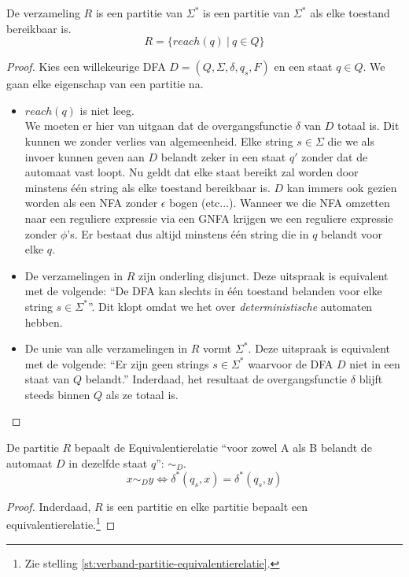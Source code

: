 \documentclass[main.tex]{subfiles}
\begin{document}
\begin{st}
  De verzameling $R$ is een partitie van $\Sigma^{*}$ is een partitie van $\Sigma^{*}$ als elke toestand bereikbaar is.
  \[ R = \{ reach(q)\ |\ q \in Q \} \]

  \begin{proof}
    Kies een willekeurige DFA $D = (Q,\Sigma,\delta,q_{s},F)$ en een staat $q\in Q$.
    We gaan elke eigenschap van een partitie na.
    \begin{itemize}
    \item $reach(q)$ is niet leeg.\\
      We moeten er hier van uitgaan dat de overgangsfunctie $\delta$ van $D$ totaal is.
      Dit kunnen we zonder verlies van algemeenheid.
      Elke string $s\in \Sigma$ die we als invoer kunnen geven aan $D$ belandt zeker in een staat $q'$ zonder dat de automaat vast loopt.
      Nu geldt dat elke staat bereikt zal worden door minstens \'e\'en string als elke toestand bereikbaar is.
      $D$ kan immers ook gezien worden als een NFA zonder $\epsilon$ bogen (etc...). Wanneer we die NFA omzetten naar een reguliere expressie via een GNFA krijgen we een reguliere expressie zonder $\phi$'s. Er bestaat dus altijd minstens \'e\'en string die in $q$ belandt voor elke $q$.
    \item De verzamelingen in $R$ zijn onderling disjunct.
      Deze uitspraak is equivalent met de volgende: ``De DFA kan slechts in \'e\'en toestand belanden voor elke string $s\in\Sigma^{*}$''. Dit klopt omdat we het over \emph{deterministische} automaten hebben.
    \item De unie van alle verzamelingen in $R$ vormt $\Sigma^{*}$.
      Deze uitspraak is equivalent met de volgende: ``Er zijn geen strings $s\in \Sigma^{*}$ waarvoor de DFA $D$ niet in een staat van $Q$ belandt.''
      Inderdaad, het resultaat de overgangsfunctie $\delta$ blijft steeds binnen $Q$ als ze totaal is.
    \end{itemize}
  \end{proof}
\end{st}

\begin{gev}
  De partitie $R$ bepaalt de Equivalentierelatie ``voor zowel A als B belandt de automaat $D$ in dezelfde staat $q$'': $\sim_{D}$.
  \[ x \sim_{D} y \Leftrightarrow \delta^{*}(q_{s},x) = \delta^{*}(q_{s},y) \]

  \begin{proof}
    Inderdaad, $R$ is een partitie en elke partitie bepaalt een equivalentierelatie.\footnote{Zie stelling \ref{st:verband-partitie-equivalentierelatie}.}
  \end{proof}
\end{gev}
\end{document}
